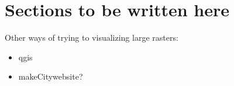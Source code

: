 \section{Sections to be written here} 

Other ways of trying to visualizing large rasters:

\begin{itemize}
	\item qgis
	\item makeCitywebsite?
\end{itemize}

